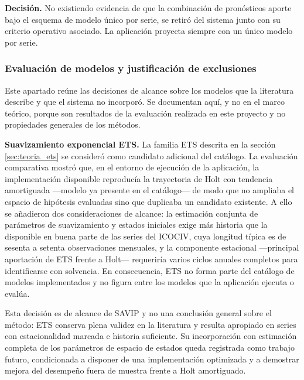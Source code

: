 \documentclass[12pt,letterpaper]{article}
\newcommand{\ICOCIV}{ICOCIV}
\begin{document}
\textbf{Decisión.} No existiendo evidencia de que la combinación de pronósticos aporte bajo el esquema de modelo único por serie, se retiró del sistema junto con su criterio operativo asociado. La aplicación proyecta siempre con un único modelo por serie.

\subsubsection{Evaluación de modelos y justificación de exclusiones}
\label{sec:decisiones_alcance_modelos}

Este apartado reúne las decisiones de alcance sobre los modelos que la literatura describe y que el sistema no incorporó. Se documentan aquí, y no en el marco teórico, porque son resultados de la evaluación realizada en este proyecto y no propiedades generales de los métodos.

\textbf{Suavizamiento exponencial ETS.} La familia ETS descrita en la sección \ref{sec:teoria_ets} se consideró como candidato adicional del catálogo. La evaluación comparativa mostró que, en el entorno de ejecución de la aplicación, la implementación disponible reproducía la trayectoria de Holt con tendencia amortiguada ---modelo ya presente en el catálogo--- de modo que no ampliaba el espacio de hipótesis evaluadas sino que duplicaba un candidato existente. A ello se añadieron dos consideraciones de alcance: la estimación conjunta de parámetros de suavizamiento y estados iniciales exige más historia que la disponible en buena parte de las series del \ICOCIV, cuya longitud típica es de sesenta a setenta observaciones mensuales, y la componente estacional ---principal aportación de ETS frente a Holt--- requeriría varios ciclos anuales completos para identificarse con solvencia. En consecuencia, ETS no forma parte del catálogo de modelos implementados y no figura entre los modelos que la aplicación ejecuta o evalúa.

Esta decisión es de alcance de SAVIP y no una conclusión general sobre el método: ETS conserva plena validez en la literatura y resulta apropiado en series con estacionalidad marcada e historia suficiente. Su incorporación con estimación completa de los parámetros de espacio de estados queda registrada como trabajo futuro, condicionada a disponer de una implementación optimizada y a demostrar mejora del desempeño fuera de muestra frente a Holt amortiguado.
\end{document}
